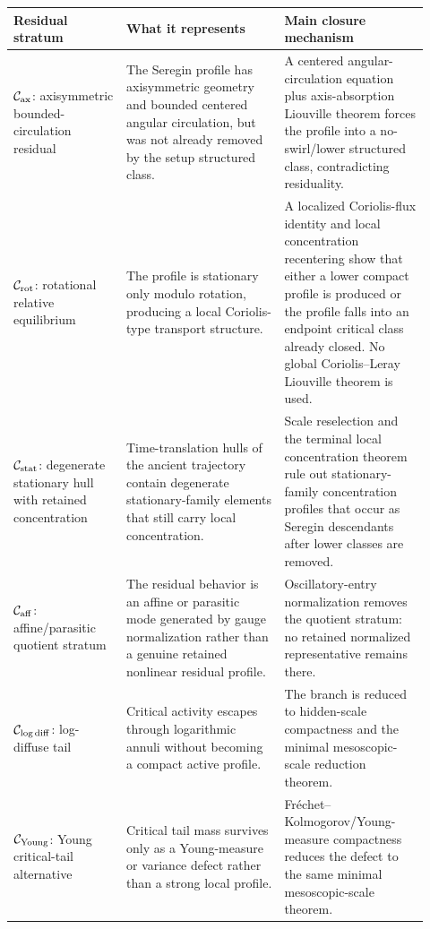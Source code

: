 \documentclass[11pt]{amsart}
\begin{document}
\begin{longtable}{@{}>{\raggedright\arraybackslash}p{0.25\linewidth}>{\raggedright\arraybackslash}p{0.35\linewidth}>{\raggedright\arraybackslash}p{0.32\linewidth}@{}}
\toprule
\textbf{Residual stratum} & \textbf{What it represents} & \textbf{Main closure mechanism} \\
\midrule
\endhead
\(\mathcal C_{\rm ax}\): axisymmetric bounded-circulation residual & The Seregin profile has axisymmetric geometry and bounded centered angular circulation, but was not already removed by the setup structured class. & A centered angular-circulation equation plus axis-absorption Liouville theorem forces the profile into a no-swirl/lower structured class, contradicting residuality. \\
\(\mathcal C_{\rm rot}\): rotational relative equilibrium & The profile is stationary only modulo rotation, producing a local Coriolis-type transport structure. & A localized Coriolis-flux identity and local concentration recentering show that either a lower compact profile is produced or the profile falls into an endpoint critical class already closed. No global Coriolis--Leray Liouville theorem is used. \\
\(\mathcal C_{\rm stat}\): degenerate stationary hull with retained concentration & Time-translation hulls of the ancient trajectory contain degenerate stationary-family elements that still carry local concentration. & Scale reselection and the terminal local concentration theorem rule out stationary-family concentration profiles that occur as Seregin descendants after lower classes are removed. \\
\(\mathcal C_{\rm aff}\): affine/parasitic quotient stratum & The residual behavior is an affine or parasitic mode generated by gauge normalization rather than a genuine retained nonlinear residual profile. & Oscillatory-entry normalization removes the quotient stratum: no retained normalized representative remains there. \\
\(\mathcal C_{\log\rm diff}\): log-diffuse tail & Critical activity escapes through logarithmic annuli without becoming a compact active profile. & The branch is reduced to hidden-scale compactness and the minimal mesoscopic-scale reduction theorem. \\
\(\mathcal C_{\rm Young}\): Young critical-tail alternative & Critical tail mass survives only as a Young-measure or variance defect rather than a strong local profile. & Fr\'echet--Kolmogorov/Young-measure compactness reduces the defect to the same minimal mesoscopic-scale theorem. \\

\end{longtable}
\end{document}
